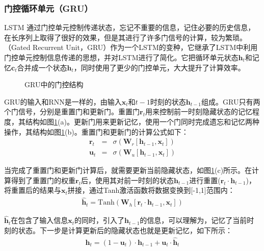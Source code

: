 \subsubsection{门控循环单元（GRU）}

\parinterval LSTM 通过门控单元控制传递状态，忘记不重要的信息，记住必要的历史信息，在长序列上取得了很好的效果，但是其进行了许多门信号的计算，较为繁琐。{\small{}}（Gated Recurrent Unit，GRU）作为一个LSTM的变种，它继承了LSTM中利用门控单元控制信息传递的思想，并对LSTM进行了简化\cite{Cho2014Learning}。它把循环单元状态$\mathbf{h}_t$和记忆$\mathbf{c}_t$合并成一个状态$\mathbf{h}_t$，同时使用了更少的门控单元，大大提升了计算效率。

\begin{figure}[htp]
\centering
\subfigure[重置门]{}
\subfigure[更新门]{}
\subfigure[隐藏状态更新]{}
\caption{GRU中的门控结构}
\label{fig:6-17}
\end{figure}

\parinterval GRU的输入和RNN是一样的，由输入$\mathbf{x}_t$和$t-1$时刻的状态$\mathbf{h}_{t-1}$组成。GRU只有两个门信号，分别是重置门和更新门。重置门$\mathbf{r}_t$用来控制前一时刻隐藏状态的记忆程度，其结构如图\ref{fig:6-17}(a)。更新门用来更新记忆，使用一个门同时完成遗忘和记忆两种操作，其结构如图\ref{fig:6-17}(b)。重置门和更新门的计算公式如下：
\begin{eqnarray}
\mathbf{r}_t & = &\sigma (\mathbf{W}_r [\mathbf{h}_{t-1},\mathbf{x}_{t}] ) \label{eq:6-18} \\
\mathbf{u}_t & = & \sigma (\mathbf{W}_u [\mathbf{h}_{t-1},\mathbf{x}_{t}]) \label{eq:6-19}
\end{eqnarray}

\parinterval 当完成了重置门和更新门计算后，就需要更新当前隐藏状态，如图\ref{fig:6-17}(c)所示。在计算得到了重置门的权重$\mathbf{r}_t$后，使用其对前一时刻的状态$\mathbf{h}_{t-1}$进行重置($\mathbf{r}_t \cdot \mathbf{h}_{t-1}$)，将重置后的结果与$\mathbf{x}_t$拼接，通过Tanh激活函数将数据变换到[-1,1]范围内：
\begin{eqnarray}
\hat{\mathbf{h}}_t = \textrm{Tanh} (\mathbf{W}_h [\mathbf{r}_t \cdot \mathbf{h}_{t-1},\mathbf{x}_{t}])
\label{eq:6-20}
\end{eqnarray}

\parinterval $\hat{\mathbf{h}}_t$在包含了输入信息$\mathbf{x}_t$的同时，引入了$\mathbf{h}_{t-1}$的信息，可以理解为，记忆了当前时刻的状态。下一步是计算更新后的隐藏状态也就是更新记忆，如下所示：
\begin{eqnarray}
\mathbf{h}_t = (1-\mathbf{u}_t) \cdot \mathbf{h}_{t-1} +\mathbf{u}_t \cdot \hat{\mathbf{h}}_t
\label{eq:6-21}
\end{eqnarray}

